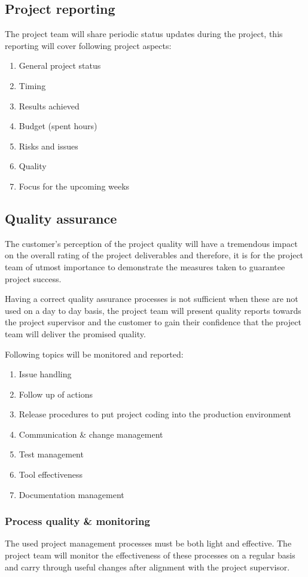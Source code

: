 \subsection{Project reporting}
The project team will share periodic status updates during the project, this reporting will cover following project aspects:
\begin{enumerate}
	\item General project status
	\item Timing
	\item Results achieved
	\item Budget (spent hours)
	\item Risks and issues
	\item Quality
	\item Focus for the upcoming weeks
\end {enumerate}

\subsection{Quality assurance}
The customer's perception of the project quality will have a tremendous impact on the overall rating of the project deliverables and therefore, it is for the project team of utmost importance to demonstrate the measures taken to guarantee project success. 

Having a correct quality assurance processes is not sufficient when these are not used on a day to day basis, the project team will present quality reports towards the project supervisor and the customer to gain their confidence that the project team will deliver the promised quality.


Following topics will be monitored and reported: 
\begin{enumerate}
	\item Issue handling
	\item Follow up of actions
	\item Release procedures to put project coding into the production environment
	\item Communication \& change management
	\item Test management
	\item Tool effectiveness
	\item Documentation management
\end {enumerate}

\subsubsection{Process quality \& monitoring}
The  used project management processes must be both light and effective. 
The project team will monitor the effectiveness of these processes on a regular basis and carry through useful changes after alignment with the project supervisor. 

